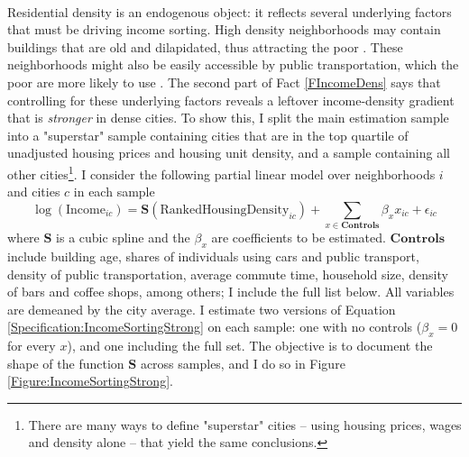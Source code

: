 \documentclass[12pt]{article}
\begin{document}
	\paragraph*{}
	Residential density is an endogenous object: it reflects several underlying factors that must be driving income sorting. High density neighborhoods may contain buildings that are old and dilapidated, thus attracting the poor \citep{Gentrificationcycles}. These neighborhoods might also be easily accessible by public transportation, which the poor are more likely to use \citep{ccpoortransport}. The second part of Fact \ref{FIncomeDens} says that controlling for these underlying factors reveals a leftover income-density gradient that is \textit{stronger} in dense cities. To show this, I split the main estimation sample into a "superstar" sample containing cities that are in the top quartile of unadjusted housing prices and housing unit density, and a sample containing all other cities\footnote{There are many ways to define "superstar" cities -- using housing prices, wages and density alone -- that yield the same conclusions.}. I consider the following partial linear model over neighborhoods $i$ and cities $c$ in each sample
	\begin{equation}\label{Specification:IncomeSortingStrong}
	\log(\text{Income}_{ic}) = \mathbf{S}(\text{RankedHousingDensity}_{ic}) + \sum_{x \in \mathbf{Controls}}\beta_{x}x_{ic} + \epsilon_{ic}
	\end{equation}
	where $\mathbf{S}$ is a cubic spline and the $\beta_{x}$ are coefficients to be estimated. $\mathbf{Controls}$ include building age, shares of individuals using cars and public transport, density of public transportation, average commute time, household size, density of bars and coffee shops, among others; I include the full list below. All variables are demeaned by the city average. I estimate two versions of Equation \eqref{Specification:IncomeSortingStrong} on each sample: one with no controls ($\beta_{x} = 0$ for every $x$), and one including the full set. The objective is to document the shape of the function $\mathbf{S}$ across samples, and I do so in Figure \ref{Figure:IncomeSortingStrong}. 
\end{document}
